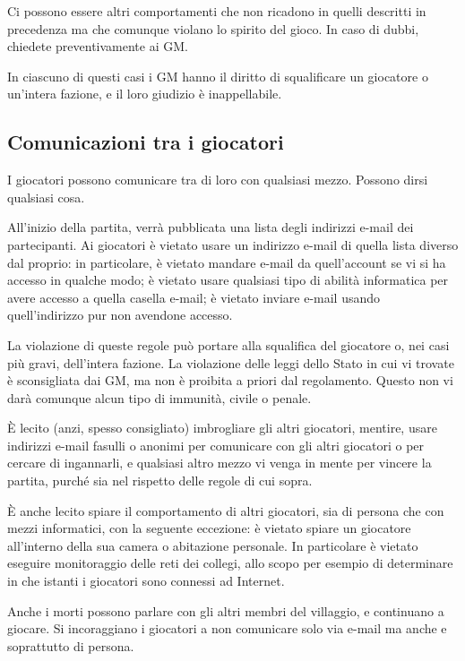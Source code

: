 \documentclass[a4paper,10pt]{article}
\begin{document}
Ci possono essere altri comportamenti che non ricadono in quelli descritti in precedenza ma che comunque violano lo spirito del gioco. In caso di dubbi, chiedete preventivamente ai GM.

In ciascuno di questi casi i GM hanno il diritto di squalificare un giocatore o un'intera fazione, e il loro giudizio è inappellabile.

\subsection{Comunicazioni tra i giocatori}

I giocatori possono comunicare tra di loro con qualsiasi mezzo. Possono dirsi qualsiasi cosa.

All'inizio della partita, verrà pubblicata una lista degli indirizzi e-mail dei partecipanti. Ai giocatori è vietato usare un indirizzo e-mail di quella lista diverso dal proprio: in particolare, è vietato mandare e-mail da quell'account se vi si ha accesso in qualche modo; è vietato usare qualsiasi tipo di abilità informatica per avere accesso a quella casella e-mail; è vietato inviare e-mail usando quell'indirizzo pur non avendone accesso.

La violazione di queste regole può portare alla squalifica del giocatore o, nei casi più gravi, dell'intera fazione. La violazione delle leggi dello Stato in cui vi trovate è sconsigliata dai GM, ma non è proibita a priori dal regolamento. Questo non vi darà comunque alcun tipo di immunità, civile o penale.

È lecito (anzi, spesso consigliato) imbrogliare gli altri giocatori, mentire, usare indirizzi e-mail fasulli o anonimi per comunicare con gli altri giocatori o per cercare di ingannarli, e qualsiasi altro mezzo vi venga in mente per vincere la partita, purché sia nel rispetto delle regole di cui sopra.

È anche lecito spiare il comportamento di altri giocatori, sia di persona che con mezzi informatici, con la seguente eccezione: è vietato spiare un giocatore all'interno della sua camera o abitazione personale. In particolare è vietato eseguire monitoraggio delle reti dei collegi, allo scopo per esempio di determinare in che istanti i giocatori sono connessi ad Internet.

Anche i morti possono parlare con gli altri membri del villaggio, e continuano a giocare. Si incoraggiano i giocatori a non comunicare solo via e-mail ma anche e soprattutto di persona.
\end{document}
